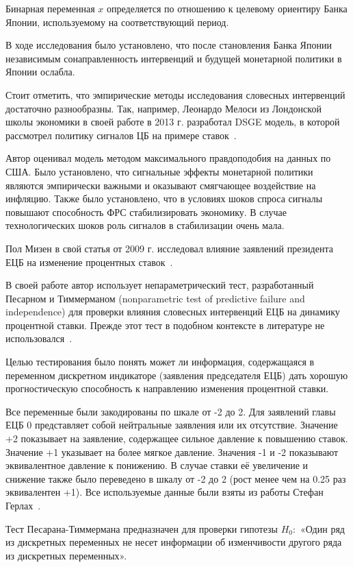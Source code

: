 \documentclass[14pt,a4paper, oneside]{extreport}
\theoremstyle{plain}              %
\theoremstyle{definition}         %
\begin{document}
Бинарная переменная $x$ определяется по отношению к целевому ориентиру Банка Японии, используемому на соответствующий период.

В ходе исследования было установлено, что после  становления Банка Японии независимым  сонаправленность интервенций и будущей монетарной политики в Японии ослабла. 


Стоит отметить, что эмпирические методы исследования словесных интервенций достаточно разнообразны. Так, например, Леонардо Мелоси из Лондонской школы экономики в своей работе в 2013 г. разработал DSGE модель, в которой рассмотрел политику сигналов ЦБ на примере ставок~\cite{melosi2013signaling}.
 
Автор оценивал модель методом максимального правдоподобия на данных по США. Было установлено, что сигнальные эффекты монетарной политики являются эмпирически важными и оказывают смягчающее воздействие на инфляцию. Также было установлено, что в условиях шоков спроса сигналы повышают способность ФРС стабилизировать экономику. В случае технологических шоков роль сигналов в стабилизации очень мала. 


Пол Мизен в свой статья от 2009 г. исследовал влияние заявлений президента ЕЦБ на изменение процентных ставок~\cite{mizen2009can}.

В своей работе автор использует непараметрический тест, разработанный Песарном и Тиммерманом (nonparametric test of predictive failure and independence) для проверки влияния словесных интервенций ЕЦБ на динамику процентной ставки. Прежде этот тест в подобном контексте в литературе не использовался~\cite{pesaran2000recursive}. \label{P_T}

Целью тестирования было понять может ли информация, содержащаяся в переменном дискретном индикаторе (заявления председателя ЕЦБ) дать хорошую прогностическую способность к направлению изменения процентной ставки. 

Все переменные были закодированы по шкале от -2 до 2. Для заявлений главы ЕЦБ 0 представляет собой нейтральные заявления или их отсутствие. Значение +2 показывает на заявление, содержащее сильное давление к повышению ставок.
Значение +1 указывает на более мягкое давление. Значения -1 и -2 показывают эквивалентное давление к понижению. В случае ставки её увеличение и снижение также было переведено в шкалу от -2 до 2 (рост менее чем на 0.25 раз эквивалентен +1). Все используемые данные были взяты из работы 
Стефан Герлах~\cite{gerlach2007interest}.

Тест Песарана-Тиммермана предназначен для проверки гипотезы $H_0:$ «Один ряд из дискретных переменных не несет информации об изменчивости другого ряда из дискретных переменных».
\end{document}
